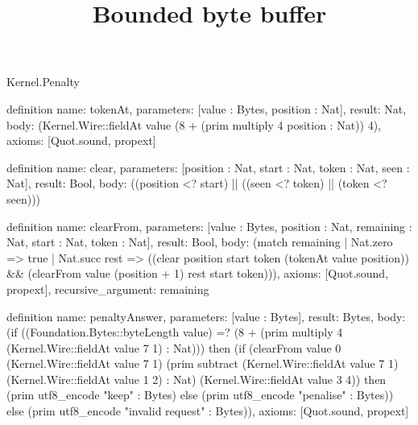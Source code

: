 \begin{lexlean}{Kernel.Penalty}
\title{Bounded byte buffer}
\begin{semanticmodule}
definition{
  name: tokenAt,
  parameters: [value : Bytes, position : Nat],
  result: Nat,
  body: (Kernel.Wire::fieldAt value (8 + (prim multiply 4 position : Nat)) 4),
  axioms: [Quot.sound, propext]
}

definition{
  name: clear,
  parameters: [position : Nat, start : Nat, token : Nat, seen : Nat],
  result: Bool,
  body: ((position <? start) || ((seen <? token) || (token <? seen)))
}

definition{
  name: clearFrom,
  parameters: [value : Bytes, position : Nat, remaining : Nat, start : Nat, token : Nat],
  result: Bool,
  body: (match remaining
    | Nat.zero => true
    | Nat.succ rest => ((clear position start token (tokenAt value position)) && (clearFrom value (position + 1) rest start token))),
  axioms: [Quot.sound, propext],
  recursive_argument: remaining
}

definition{
  name: penaltyAnswer,
  parameters: [value : Bytes],
  result: Bytes,
  body: (if ((Foundation.Bytes::byteLength value) =? (8 + (prim multiply 4 (Kernel.Wire::fieldAt value 7 1) : Nat))) then (if (clearFrom value 0 (Kernel.Wire::fieldAt value 7 1) (prim subtract (Kernel.Wire::fieldAt value 7 1) (Kernel.Wire::fieldAt value 1 2) : Nat) (Kernel.Wire::fieldAt value 3 4)) then (prim utf8_encode "keep" : Bytes) else (prim utf8_encode "penalise" : Bytes)) else (prim utf8_encode "invalid request" : Bytes)),
  axioms: [Quot.sound, propext]
}
\end{semanticmodule}
\end{lexlean}
